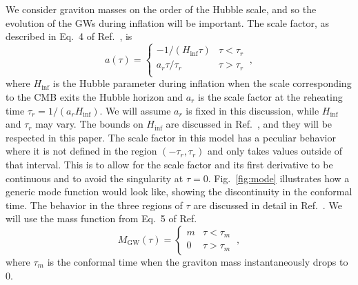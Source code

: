 \documentclass[prd,twocolumn,aps,psfig,nofootinbib,nobibnotes,superscriptaddress,preprintnumbers,times]{revtex4-2}
\begin{document}
We consider graviton masses on the order of the Hubble scale, and so the evolution of the GWs during inflation will be important.
The scale factor, as described in Eq.\ 4 of Ref.\ \cite{Fujita:2018ehq}, is
\begin{equation}\label{eqn:scale_fac}
    a(\tau) = 
    \begin{cases}
        -1/(H_{\inf}\tau) & \tau < \tau_r \\
        a_r \tau/\tau_r & \tau > \tau_r \\
   \end{cases} \ ,
\end{equation}
where $H_{\inf}$ is the Hubble parameter during inflation when the scale corresponding to the CMB exits the Hubble horizon and $a_r$ is the scale factor at the reheating time $\tau_r = 1/(a_r H_{\inf})$. We will assume $a_r$ is fixed in this discussion, while $H_{\inf}$ and $\tau_r$ may vary. The bounds on $H_{\inf}$ are discussed in Ref.\ \cite{Jiang:2015qor}, and they will be respected in this paper. The scale factor in this model has a peculiar behavior where it is not defined in the region $(-\tau_r, \tau_r)$ and only takes values outside of that interval. This is to allow for the scale factor and its first derivative to be continuous and to avoid the singularity at $\tau = 0$. Fig.\ \ref{fig:mode} illustrates how a generic mode function would look like, showing  the discontinuity in the conformal time. The behavior in the three regions of $\tau$ are discussed in detail in Ref.\ \cite{Fujita:2018ehq}.
We will use the mass function from Eq.\ 5 of Ref.\ \cite{Fujita:2018ehq}
\begin{equation}\label{eqn:mass_case}
    M_\text{GW}(\tau) = 
    \begin{cases}
        m & \tau < \tau_m \\
        0 & \tau > \tau_m
   \end{cases} \ ,
\end{equation} 
where $\tau_m$ is the conformal time when the graviton mass instantaneously drops to 0.
\end{document}

